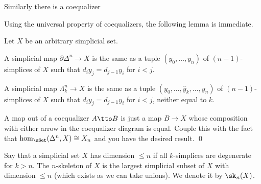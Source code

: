 Similarly there is a coequalizer

\bigskip
\centerline{}

Using the universal property of coequalizers, the following lemma is immediate.

\blemm

    Let $X$ be an arbitrary simplicial set.
    \benum
        \item A simplicial map $\partial\Delta^n\to X$ is the same as a tuple $(y_0,\dots,y_n)$ of $(n-1)$-simplices
        of $X$ such that $d_iy_j=d_{j-1}y_i$ for $i<j$.
        \item A simplicial map $\Lambda^n_k\to X$ is the same as a tuple $(y_0,\dots,\hat y_k,\dots,y_n)$ of $(n-1)$-simplices
        of $X$ such that $d_iy_j=d_{j-1}y_i$ for $i<j$, neither equal to $k$.
    \eenum

\elemm

\bproof

    A map out of a coequalizer $A\tto B$ is just a map $B\to X$ whose composition with either arrow in the coequalizer
    diagram is equal.
    Couple this with the fact that $\hom_\sSet(\Delta^n,X)\cong X_n$ and you have the desired result.
    \qed

\eproof

\bdefn

    Say that a simplicial set $X$ has dimension $\leq n$ if all $k$-simplices are degenerate for $k>n$.
    The {\emphcolor $n$-skeleton} of $X$ is the largest simplicial subset of $X$ with dimension $\leq n$ (which exists as we can take unions).
    We denote it by $\sk_n(X)$.

\edefn


